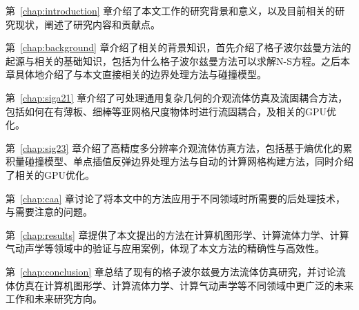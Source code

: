 第~\ref{chap:introduction} 章介绍了本文工作的研究背景和意义，以及目前相关的研究现状，阐述了研究内容和贡献点。

第~\ref{chap:background} 章介绍了相关的背景知识，首先介绍了格子波尔兹曼方法的起源与相关的基础知识，包括为什么格子波尔兹曼方法可以求解N-S方程。之后本章具体地介绍了与本文直接相关的边界处理方法与碰撞模型。

第~\ref{chap:siga21} 章介绍了可处理通用复杂几何的介观流体仿真及流固耦合方法，包括如何在有薄板、细棒等亚网格尺度物体时进行流固耦合，及相关的GPU优化。

第~\ref{chap:sig23} 章介绍了高精度多分辨率介观流体仿真方法，包括基于熵优化的累积量碰撞模型、单点插值反弹边界处理方法与自动的计算网格构建方法，同时介绍了相关的GPU优化。

第~\ref{chap:caa} 章讨论了将本文中的方法应用于不同领域时所需要的后处理技术，与需要注意的问题。

第~\ref{chap:results} 章提供了本文提出的方法在计算机图形学、计算流体力学、计算气动声学等领域中的验证与应用案例，体现了本文方法的精确性与高效性。

第~\ref{chap:conclusion} 章总结了现有的格子波尔兹曼方法流体仿真研究，并讨论流体仿真在计算机图形学、计算流体力学、计算气动声学等不同领域中更广泛的未来工作和未来研究方向。